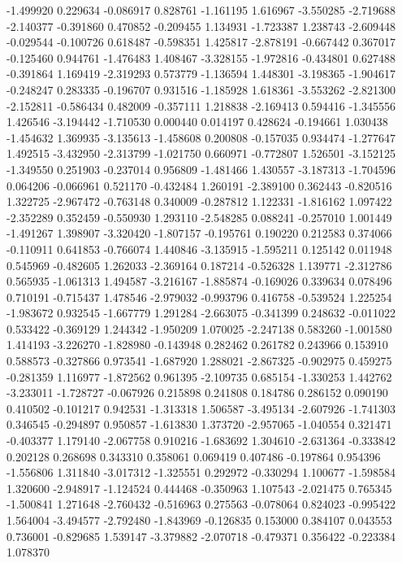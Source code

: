 -1.499920
0.229634
-0.086917
0.828761
-1.161195
1.616967
-3.550285
-2.719688
-2.140377
-0.391860
0.470852
-0.209455
1.134931
-1.723387
1.238743
-2.609448
-0.029544
-0.100726
0.618487
-0.598351
1.425817
-2.878191
-0.667442
0.367017
-0.125460
0.944761
-1.476483
1.408467
-3.328155
-1.972816
-0.434801
0.627488
-0.391864
1.169419
-2.319293
0.573779
-1.136594
1.448301
-3.198365
-1.904617
-0.248247
0.283335
-0.196707
0.931516
-1.185928
1.618361
-3.553262
-2.821300
-2.152811
-0.586434
0.482009
-0.357111
1.218838
-2.169413
0.594416
-1.345556
1.426546
-3.194442
-1.710530
0.000440
0.014197
0.428624
-0.194661
1.030438
-1.454632
1.369935
-3.135613
-1.458608
0.200808
-0.157035
0.934474
-1.277647
1.492515
-3.432950
-2.313799
-1.021750
0.660971
-0.772807
1.526501
-3.152125
-1.349550
0.251903
-0.237014
0.956809
-1.481466
1.430557
-3.187313
-1.704596
0.064206
-0.066961
0.521170
-0.432484
1.260191
-2.389100
0.362443
-0.820516
1.322725
-2.967472
-0.763148
0.340009
-0.287812
1.122331
-1.816162
1.097422
-2.352289
0.352459
-0.550930
1.293110
-2.548285
0.088241
-0.257010
1.001449
-1.491267
1.398907
-3.320420
-1.807157
-0.195761
0.190220
0.212583
0.374066
-0.110911
0.641853
-0.766074
1.440846
-3.135915
-1.595211
0.125142
0.011948
0.545969
-0.482605
1.262033
-2.369164
0.187214
-0.526328
1.139771
-2.312786
0.565935
-1.061313
1.494587
-3.216167
-1.885874
-0.169026
0.339634
0.078496
0.710191
-0.715437
1.478546
-2.979032
-0.993796
0.416758
-0.539524
1.225254
-1.983672
0.932545
-1.667779
1.291284
-2.663075
-0.341399
0.248632
-0.011022
0.533422
-0.369129
1.244342
-1.950209
1.070025
-2.247138
0.583260
-1.001580
1.414193
-3.226270
-1.828980
-0.143948
0.282462
0.261782
0.243966
0.153910
0.588573
-0.327866
0.973541
-1.687920
1.288021
-2.867325
-0.902975
0.459275
-0.281359
1.116977
-1.872562
0.961395
-2.109735
0.685154
-1.330253
1.442762
-3.233011
-1.728727
-0.067926
0.215898
0.241808
0.184786
0.286152
0.090190
0.410502
-0.101217
0.942531
-1.313318
1.506587
-3.495134
-2.607926
-1.741303
0.346545
-0.294897
0.950857
-1.613830
1.373720
-2.957065
-1.040554
0.321471
-0.403377
1.179140
-2.067758
0.910216
-1.683692
1.304610
-2.631364
-0.333842
0.202128
0.268698
0.343310
0.358061
0.069419
0.407486
-0.197864
0.954396
-1.556806
1.311840
-3.017312
-1.325551
0.292972
-0.330294
1.100677
-1.598584
1.320600
-2.948917
-1.124524
0.444468
-0.350963
1.107543
-2.021475
0.765345
-1.500841
1.271648
-2.760432
-0.516963
0.275563
-0.078064
0.824023
-0.995422
1.564004
-3.494577
-2.792480
-1.843969
-0.126835
0.153000
0.384107
0.043553
0.736001
-0.829685
1.539147
-3.379882
-2.070718
-0.479371
0.356422
-0.223384
1.078370
